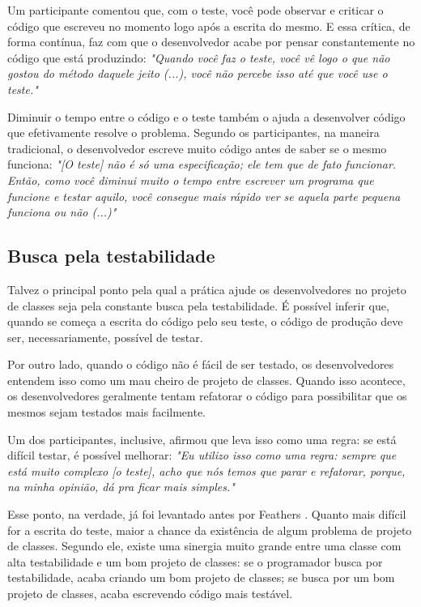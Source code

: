 Um participante comentou que, com o teste, você pode observar
e criticar o código que escreveu no momento logo após a escrita do mesmo.
E essa crítica, de forma contínua, faz com que o desenvolvedor acabe
por pensar constantemente no código que está produzindo:
\textit{"Quando você faz o teste, você vê logo o que não gostou do método daquele jeito (...), você
não percebe isso até que você use o teste."}

Diminuir o tempo entre o código e o teste também o ajuda a desenvolver código
que efetivamente resolve o problema. Segundo os participantes, na maneira tradicional, 
o desenvolvedor escreve muito código antes de saber se o mesmo funciona:
\textit{"[O teste] não é só uma especificação; ele tem que de fato funcionar. Então,
como você diminui muito o tempo entre escrever um programa que funcione e testar aquilo,
você consegue mais rápido ver se aquela parte pequena funciona ou não (...)"}


\subsection{Busca pela testabilidade}

Talvez o principal ponto pela qual a prática ajude os desenvolvedores no projeto de classes 
seja pela constante busca pela testabilidade. É possível inferir que, quando se 
começa a escrita do código pelo seu teste, o código de produção deve ser, necessariamente,
possível de testar.

Por outro lado, quando o código não é fácil de ser testado, os desenvolvedores
entendem isso como um mau cheiro de projeto de classes. Quando isso acontece,
os desenvolvedores geralmente tentam refatorar o código para possibilitar que
os mesmos sejam testados mais facilmente.

Um dos participantes, inclusive, afirmou que leva isso como uma regra:
se está difícil testar, é possível melhorar:
\textit{"Eu utilizo isso como uma regra: sempre que está muito complexo [o teste],
acho que nós temos que parar e refatorar, porque, na minha opinião, dá
pra ficar mais simples."}

Esse ponto, na verdade, já foi levantado antes por Feathers \cite{feathers-synergy}.
Quanto mais difícil for a escrita do teste, maior a chance da existência de
algum problema de projeto de classes. Segundo ele, 
existe uma sinergia muito grande entre uma classe com alta testabilidade e um bom projeto de classes: 
se o programador busca por testabilidade, acaba criando um bom projeto de classes; se 
busca por um bom projeto de classes, acaba escrevendo código mais
testável.


